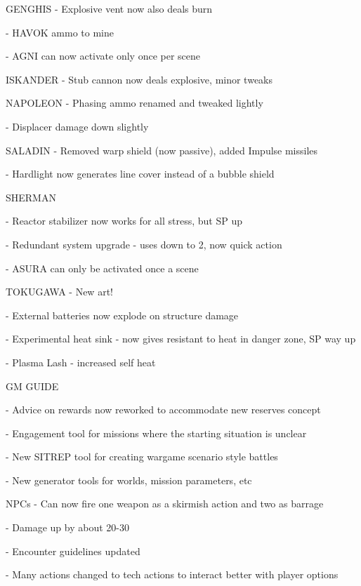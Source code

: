 GENGHIS  
    -    Explosive vent now also deals burn
 
    -    HAVOK ammo to mine
 

    -    AGNI can now activate only once per scene
 

ISKANDER  
    -    Stub cannon now deals explosive, minor tweaks
 

NAPOLEON  
    -    Phasing ammo renamed and tweaked lightly
 
    -    Displacer damage down slightly
 

SALADIN  
    -    Removed warp shield (now passive), added Impulse missiles
 

    -    Hardlight now generates line cover instead of a bubble shield
 
SHERMAN 
 
    -    Reactor stabilizer now works for all stress, but SP up
 

    -    Redundant system  upgrade - uses down to 2, now quick action
 
    -    ASURA can only be activated once a scene
 

TOKUGAWA   
    -    New art!
 
    -    External batteries now explode on structure damage
 
    -    Experimental heat sink - now gives resistant to heat in danger zone, SP way up
 

    -    Plasma Lash - increased self heat
 

GM GUIDE  

                                                                                                                    


     -    Advice on rewards now reworked to accommodate new reserves concept
 

     -    Engagement tool for missions where the starting situation is unclear
 
     -    New SITREP tool for creating wargame scenario style battles
 
     -    New generator tools for worlds, mission parameters, etc
 

NPCs  
     -    Can now fire one weapon as a skirmish action and two as barrage
 

     -    Damage up by about 20-30%
 
     -    Encounter guidelines updated
 

     -    Many actions changed to tech actions to interact better with player options
 

